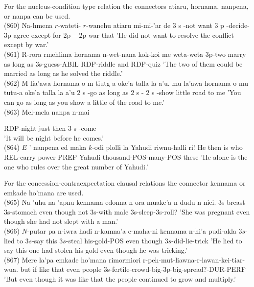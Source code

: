 \documentclass[10pt]{article}
\begin{document}
For the nucleus-condition type relation the connectors atiaru, hornama, nanpena, or nanpa can be used.\\
(860) Na-hmena \(r\)-wateti- \(r\)-wanehu atiaru mi-mi-'ar de 3 s -not want 3 p -decide-3p-agree except for \(2 \mathrm{p}-2 \mathrm{p}\)-war that 'He did not want to resolve the conflict except by war.'\\
(861) R-rora rmehlima hornama n-wet-nana kok-koi me weta-weta 3p-two marry as long as 3s-guess-ABIL RDP-riddle and RDP-quiz 'The two of them could be married as long as he solved the riddle.'\\
(862) M-lia'awa hornama o-m-tiutg-a oke'a talla la a'u. mu-la'awa hornama o-mu-tutu-a oke'a talla la a'u 2 s -go as long as 2 s - 2 s -show little road to me 'You can go as long as you show a little of the road to me.'\\
(863) Mel-mela nanpa n-mai

RDP-night just then 3 s -come\\
'It will be night before he comes.'\\
(864) \(E\) ' nanpena ed maka \(k\)-odi plolli la Yahudi riwnu-halli ri! He then is who REL-carry power PREP Yahudi thousand-POS-many-POS these 'He alone is the one who rules over the great number of Yahudi.'

For the concession-contraexpectation clausal relations the connector kennama or emkade ho'mana are used.\\
(865) Na-'uhu-na-'apnu kennama edonna n-ora muake'a n-dudu-n-niei. 3s-breast-3s-stomach even though not 3s-with male 3s-sleep-3s-roll? 'She was pregnant even though she had not slept with a man.'\\
(866) \(N\)-putar pa n-iwra hadi n-kamna'a e-maha-ni kennama n-hi'a pudi-akla \(3 s\)-lied to \(3 s\)-say this \(3 s\)-steal his-gold-POS even though \(3 s\)-did-lie-trick 'He lied to say this one had stolen his gold even though he was tricking.'\\
(867) Mere la'pa emkade ho'mana rimormiori r-peh-mut-liawna-r-lawan-kei-tiar-wua. but if like that even people 3s-fertile-crowd-big-3p-big-spread?-DUR-PERF 'But even though it was like that the people continued to grow and multiply.'
\end{document}
